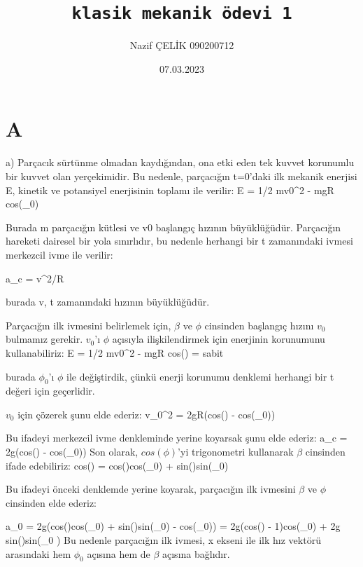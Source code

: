 \documentclass[12pt]{article}
\title{ \texttt{klasik mekanik ödevi 1}}
\author{Nazif ÇELİK 090200712}
\date{07.03.2023}
\begin{document}
\maketitle
\newpage
\section{A}
a) Parçacık sürtünme olmadan kaydığından, ona etki eden tek kuvvet korunumlu bir kuvvet olan yerçekimidir. Bu nedenle, parçacığın t=0'daki ilk mekanik enerjisi E, kinetik ve potansiyel enerjisinin toplamı ile verilir:
\bigbreak
E = 1/2 mv0^2 - mgR cos(\phi_0)

Burada m parçacığın kütlesi ve v0 başlangıç hızının büyüklüğüdür.
\bigbreak
Parçacığın hareketi dairesel bir yola sınırlıdır, bu nedenle herhangi bir t zamanındaki ivmesi merkezcil ivme ile verilir:
\bigbreak
 
 a_c = v^2/R            
 
 burada v, t zamanındaki hızının büyüklüğüdür.


\bigbreak
Parçacığın ilk ivmesini belirlemek için, $\beta$ ve $\phi$ cinsinden başlangıç hızını $v_0$ bulmamız gerekir. 
$v_0$'ı $\phi$ açısıyla ilişkilendirmek için enerjinin korunumunu kullanabiliriz:
\bigbreak
E = 1/2 mv0^2 - mgR cos(\phi) = sabit

burada $\phi_0$'ı $\phi$ ile değiştirdik, çünkü enerji korunumu denklemi herhangi bir t değeri için geçerlidir.
\bigbreak

$v_0$ için çözerek şunu elde ederiz:
\bigbreak
v_0^2 = 2gR(cos(\phi) - cos(\phi_0))


Bu ifadeyi merkezcil ivme denkleminde yerine koyarsak şunu elde ederiz:
\bigbreak
a_c = 2g(cos(\phi) - cos(\phi_0))
\bigbreak
Son olarak, $cos(\phi)$'yi trigonometri kullanarak $\beta$ cinsinden ifade edebiliriz:
\bigbreak
cos(\phi) = cos(\phi)cos(\phi_0) + sin(\beta)sin(\phi_0)

Bu ifadeyi önceki denklemde yerine koyarak, parçacığın ilk ivmesini $\beta$ ve $\phi$ cinsinden elde ederiz:


a_0 = 2g(cos(\beta)cos(\phi_0) + sin(\beta)sin(\phi_0) - cos(\phi_0)) = 2g(cos(\beta) - 1)cos(\phi_0) + 2g sin(\beta)sin(\phi_0 )
\bigbreak
Bu nedenle parçacığın ilk ivmesi, x ekseni ile ilk hız vektörü arasındaki hem $\phi_0$ açısına hem de $\beta$ açısına bağlıdır.
\newpage
\end{document}
